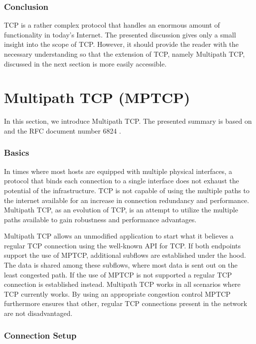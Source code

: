 \subsubsection{Conclusion}

TCP is a rather complex protocol that handles an enormous amount of functionality in today's Internet. The presented discussion gives only a small insight into the scope of TCP. However, it should provide the reader with the necessary understanding so that the extension of TCP, namely Multipath TCP, discussed in the next section is more easily accessible.

\section{Multipath TCP (MPTCP)}
\label{sec:MPTCP}

In this section, we introduce Multipath TCP. The presented summary is based on \cite{Barre2011, Raiciu2012, Wischik2011} and the RFC document number 6824 \cite{rfc6824}.

\subsubsection{Basics}

In times where most hosts are equipped with multiple physical interfaces, a protocol that binds each connection to a single interface does not exhaust the potential of the infrastructure. TCP is not capable of using the multiple paths to the internet available for an increase in connection redundancy and performance. Multipath TCP, as an evolution of TCP, is an attempt to utilize the multiple paths available to gain robustness and performance advantages.

Multipath TCP allows an unmodified application to start what it believes a regular TCP connection using the well-known API for TCP. If both endpoints support the use of MPTCP, additional subflows are established under the hood. The data is shared among these subflows, where most data is sent out on the least congested path. If the use of MPTCP is not supported a regular TCP connection is established instead. Multipath TCP works in all scenarios where TCP currently works. By using an appropriate congestion control MPTCP furthermore ensures that other, regular TCP connections present in the network are not disadvantaged. 

\subsubsection{Connection Setup}


